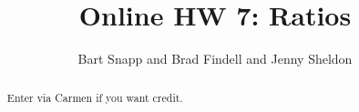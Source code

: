 \documentclass[handout,space,nooutcomes]{xourse}
\title{Online HW 7: Ratios}
\author{Bart Snapp and Brad Findell and Jenny Sheldon}
\begin{document}
\begin{abstract}
Enter via Carmen if you want credit.   
\end{abstract}
\maketitle


\end{document}
